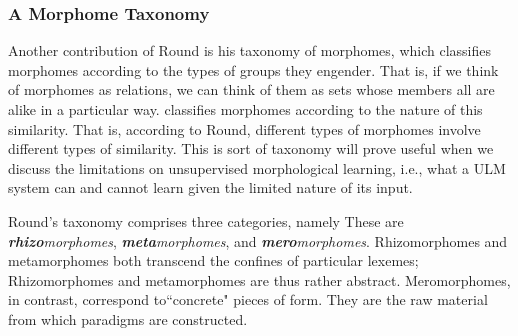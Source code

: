 


\subsubsection{A Morphome Taxonomy}
Another contribution of Round is his taxonomy of morphomes, which classifies morphomes according to the types of groups they engender. That is, if we think of morphomes as relations, we can think of them as sets whose members all are alike in a particular way. \cite{round:2015, round:md:2016} classifies morphomes according to the nature of this similarity. That is, according to Round, different types of morphomes involve different types of similarity. 
This is sort of taxonomy will prove useful 
when we discuss the limitations on unsupervised morphological learning, i.e., what a \ac{ULM} system can and cannot learn given the limited nature of its input.

Round's taxonomy comprises three categories, namely %
These are \textit{\textbf{rhizo}morphomes}, \textit{\textbf{meta}morphomes}, and \textit{\textbf{mero}morphomes}. 
Rhizomorphomes and metamorphomes both transcend the confines of particular lexemes; Rhizomorphomes and metamorphomes are thus rather abstract. Meromorphomes, in contrast, correspond to``concrete" pieces of form. They are the raw material from which paradigms are constructed. 

